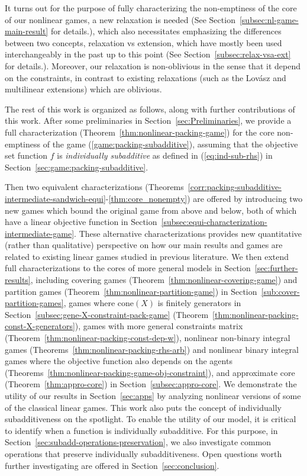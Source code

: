 \documentclass[11pt]{article}\usepackage[]{graphicx}\usepackage[]{xcolor}
\begin{document}
It turns out for the purpose of fully characterizing the non-emptiness of the core of our nonlinear games, a new relaxation is needed (See Section~\ref{subsec:nl-game-main-result} for details.), which also necessitates emphasizing the differences between two concepts, relaxation vs extension, which have mostly been used interchangeably in the past up to this point (See Section~\ref{subsec:relax-vsa-ext} for details.). Moreover, our relaxation is non-oblivious in the sense that it depend on the constraints, in contrast to existing relaxations (such as the Lov\'{a}sz and multilinear extensions) which are oblivious. 


The rest of this work is organized as follows, along with further contributions of this work. After some preliminaries in Section~\ref{sec:Preliminaries}, we provide a full characterization (Theorem~\ref{thm:nonlinear-packing-game}) for the core non-emptiness of the game (\ref{game:packing-subadditive}), assuming that the objective set function $f$ is \emph{individually subadditive} as defined in (\ref{eq:ind-sub-rhs}) in Section~\ref{sec:game:packing-subadditive}. 

Then two equivalent characterizations (Theorems~\ref{corr:packing-subadditive-intermediate-sandwich-equi}-\ref{thm:core_nonempty}) are offered by introducing two new games which bound the original game from above and below, both of which have a linear objective function in Section~\ref{subsec:equi-characterization-intermediate-game}. These alternative characterizations provides new quantitative (rather than qualitative) perspective on how our main results and games are related to existing linear games studied in previous literature. We then extend full characterizations to the cores of more general models in Section~\ref{sec:further-results}, including covering games (Theorem~\ref{thm:nonlinear-covering-game}) and partition games (Theorem~\ref{thm:nonlinear-partition-game}) in Section~\ref{sub:cover-partition-games}, games where $\text{cone}(X)$ is finitely generators in Section~\ref{subsec:gene-X-constraint-pack-game} (Theorem~\ref{thm:nonlinear-packing-const-X-generators}),  games with more general constraints matrix (Theorem~\ref{thm:nonlinear-packing-const-dep-w}), nonlinear non-binary integral games (Theorems~\ref{thm:nonlinear-packing-rhs-arb}) and nonlinear binary integral games where the objective function also depends on the agents (Theorems~\ref{thm:nonlinear-packing-game-obj-constraint}), and approximate core (Theorem~\ref{thm:appro-core}) in Section~\ref{subsec:appro-core}. We demonstrate the utility of our results in Section~\ref{sec:apps} by analyzing nonlinear versions of some of the classical linear games. This work also puts the concept of individually subadditiveness on the spotlight. To enable the utility of our model, it is critical to identify when a  function is individually subadditive. For this purpose, in Section~\ref{sec:subadd-operations-preservation}, we also investigate common operations that preserve individually subadditiveness.  Open questions worth further investigating are offered in Section~\ref{sec:conclusion}.
\end{document}
